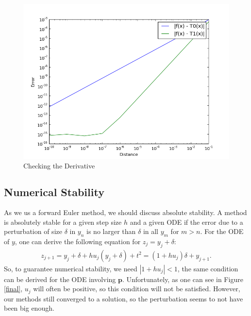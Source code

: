 \documentclass{article}
\begin{document}
\begin{figure}[H]
  \centering
  \includegraphics[scale=0.35]{deriv.png}
  \caption{Checking the Derivative}
\label{deriv}
\end{figure}
\subsection{Numerical Stability}
As we us a forward Euler method, we should discuss absolute stability. A method is absolutely stable for a given step size $h$ and a given ODE if the error due to a perturbation of size $\delta$ in
$y_n$ is no larger than  $\delta$ in all $y_m$ for $m>n$. For the ODE of $y$, one can derive the following equation for $z_{j}=y_{j}+\delta$:
\begin{align*}
  z_{j+1}=y_{j}+\delta+hu_{j}(y_{j}+\delta)+t^2=(1+hu_{j})\delta+y_{j+1}.
\end{align*}
So, to guarantee numerical stability, we need $|1+hu_{j}|<1$, the same condition can be derived
for the ODE involving $\boldsymbol{p}$. Unfortunately, as one can see in Figure \ref{final}, $u_{j}$ will
often be positive, so this condition will not be satisfied. However, our methods still converged
to a solution, so the perturbation seems to not have been big enough.
\end{document}

